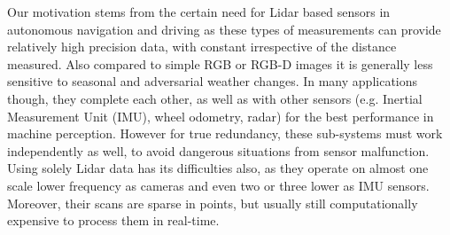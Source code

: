 \documentclass[letterpaper, 10 pt, conference]{ieeeconf}  %
\begin{document}
Our motivation stems from the certain need for Lidar based sensors in autonomous navigation and driving as these types of measurements can provide relatively high precision data, with constant irrespective of the distance measured. Also compared to simple RGB or RGB-D images it is generally less sensitive to seasonal and adversarial weather changes. In many applications though, they complete each other, as well as with other sensors (e.g. Inertial Measurement Unit (IMU), wheel odometry, radar) for the best performance in machine perception. However for true redundancy, these sub-systems must work independently as well, to avoid dangerous situations from sensor malfunction. Using solely Lidar data has its difficulties also, as they operate on almost one scale lower frequency as cameras and even two or three lower as IMU sensors. Moreover, their scans are sparse in points, but usually still computationally expensive to process them in real-time.

\end{document}
